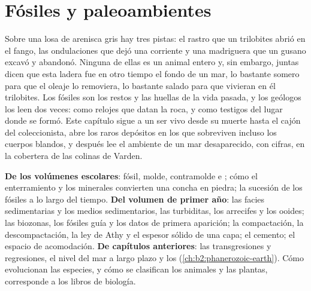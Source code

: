 \chapter{Fósiles y paleoambientes}\label{ch:b2:palaeoenvironments}

Sobre una losa de arenisca gris hay tres pistas: el rastro que un trilobites abrió en el fango,
las ondulaciones que dejó una corriente y una madriguera que un gusano excavó y abandonó. Ninguna de ellas es un
animal entero y, sin embargo, juntas dicen que esta ladera fue en otro tiempo el fondo de un mar, lo bastante somero
para que el oleaje lo removiera, lo bastante salado para que vivieran en él trilobites. Los fósiles son los
restos y las huellas de la vida pasada, y los geólogos los leen dos veces: como relojes que datan la roca,
y como testigos del lugar donde se formó. Este capítulo sigue a un ser vivo desde su muerte
hasta el cajón del coleccionista, abre los raros depósitos en los que sobreviven incluso los cuerpos blandos, y después lee
el ambiente de un mar desaparecido, con cifras, en la cobertera de las colinas de Varden.

\begin{recall}
\textbf{De los volúmenes escolares}: fósil, molde, contramolde e ; cómo el enterramiento y los minerales
convierten una concha en piedra; la sucesión de los fósiles a lo largo del tiempo. \textbf{Del volumen de primer año}:
las facies sedimentarias y los medios sedimentarios, las turbiditas, los arrecifes y los ooides; las biozonas, los fósiles
guía y los datos de primera aparición; la compactación, la descompactación, la ley de Athy y el espesor sólido
de una capa; el cemento; el espacio de acomodación. \textbf{De capítulos anteriores}: las transgresiones y regresiones,
el nivel del mar a largo plazo y los  (\cref{ch:b2:phanerozoic-earth}). Cómo
evolucionan las especies, y cómo se clasifican los animales y las plantas, corresponde a los libros de biología.
\end{recall}

